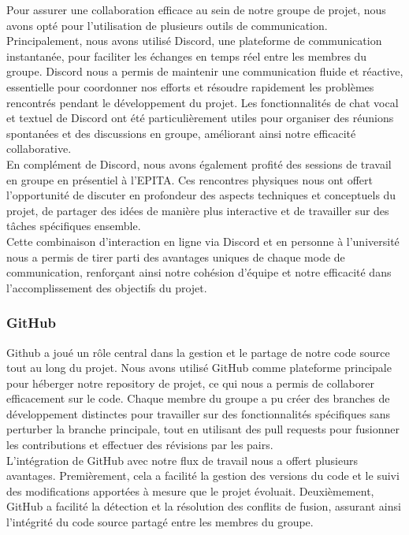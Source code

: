 Pour assurer une collaboration efficace au sein de notre groupe de projet, nous avons opté pour l'utilisation de plusieurs outils de communication. 
Principalement, nous avons utilisé Discord, une plateforme de communication instantanée, pour faciliter les échanges en temps réel entre les membres du groupe. 
Discord nous a permis de maintenir une communication fluide et réactive, essentielle pour coordonner nos efforts et résoudre rapidement les problèmes rencontrés 
pendant le développement du projet. 
Les fonctionnalités de chat vocal et textuel de Discord ont été particulièrement utiles pour organiser des réunions spontanées et des discussions en groupe, 
améliorant ainsi notre efficacité collaborative.
\\

En complément de Discord, nous avons également profité des sessions de travail en groupe en présentiel à l'EPITA. 
Ces rencontres physiques nous ont offert l'opportunité de discuter en profondeur des aspects techniques et conceptuels du projet, 
de partager des idées de manière plus interactive et de travailler sur des tâches spécifiques ensemble. 
\\

Cette combinaison d'interaction en ligne via Discord et en personne à l'université nous a permis de tirer parti des avantages uniques de chaque mode de communication,
renforçant ainsi notre cohésion d'équipe et notre efficacité dans l'accomplissement des objectifs du projet.
\\



\subsubsection{GitHub}

Github a joué un rôle central dans la gestion et le partage de notre code source tout au long du projet.
Nous avons utilisé GitHub comme plateforme principale pour héberger notre repository de projet, ce qui nous a permis de collaborer efficacement sur le code.
Chaque membre du groupe a pu créer des branches de développement distinctes pour travailler sur des fonctionnalités spécifiques sans perturber la branche principale, tout en utilisant des pull requests pour fusionner les contributions et effectuer des révisions par les pairs.
\\

L'intégration de GitHub avec notre flux de travail nous a offert plusieurs avantages.
Premièrement, cela a facilité la gestion des versions du code et le suivi des modifications apportées à mesure que le projet évoluait.
Deuxièmement, GitHub a facilité la détection et la résolution des conflits de fusion, assurant ainsi l'intégrité du code source partagé entre les membres du groupe.
\\
